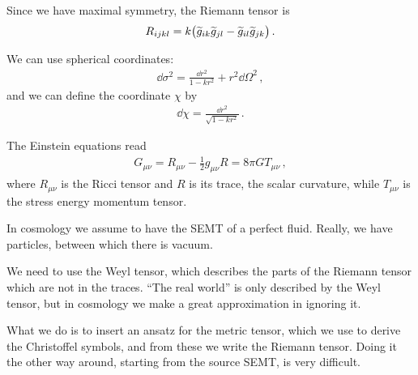 \documentclass[main.tex]{subfiles}
\begin{document}
Since we have maximal symmetry, the Riemann tensor is 
%
\begin{align}
R_{ijkl} = k \qty(\widetilde{g}_{ik} \widetilde{g}_{jl} - \widetilde{g}_{il} \widetilde{g}_{jk})
\,.
\end{align}

We can use spherical coordinates: 
%
\begin{align}
\dd{\sigma^2 } = \frac{ \dd{r^2}}{1 - k r^2} + r^2 \dd{\Omega^2}
\,,
\end{align}
%
and we can define the coordinate \(\chi \) by 
%
\begin{align}
\dd{\chi } = \frac{ \dd{r^2}}{\sqrt{1 - k r^2}}
\,.
\end{align}

The Einstein equations read 
%
\begin{align}
G_{\mu \nu } = R_{\mu \nu } - \frac{1}{2} g_{\mu \nu } R = 8 \pi G T_{\mu \nu }
\,,
\end{align}
%
where \(R_{\mu \nu }\) is the Ricci tensor and \(R\) is its trace, the scalar curvature, while \(T_{\mu \nu } \) is the stress energy momentum tensor. 

In cosmology we assume to have the SEMT of a perfect fluid. 
Really, we have particles, between which there is vacuum. 

We need to use the Weyl tensor, which describes the parts of the Riemann tensor which are not in the traces. 
``The real world'' is only described by the Weyl tensor, but in cosmology we make a great approximation in ignoring it. 

What we do is to insert an ansatz for the metric tensor, which we use to derive the Christoffel symbols, and from these we write the Riemann tensor. 
Doing it the other way around, starting from the source SEMT, is very difficult. 
\end{document}
